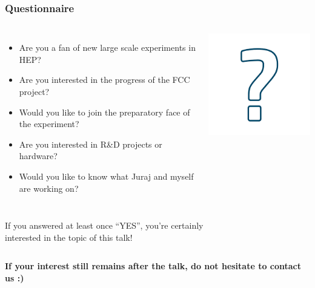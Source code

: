 \documentclass[aspectratio=169]{beamer}
\newcommand{\bluetext}[1]{%
  \textcolor{myBlue}{#1}
}
\begin{document}
\begin{frame}
  \frametitle{Questionnaire}

  \begin{columns}

    \begin{itemize}
      \item Are you a fan of new large scale experiments in HEP\@?
      \item Are you interested in the progress of the FCC project?
      \item Would you like to join the preparatory face of the experiment?
      \item Are you interested in R\&D projects or hardware?
      \item Would you like to know what Juraj and myself are working on?
    \end{itemize}
    \pause%


    \begin{center}
      \includegraphics[width=0.5\linewidth]{figures/question.png}
    \end{center}
  \end{columns}
  \pause%

  \vspace{1ex}
  \bluetext{If you answered at least once ``YES'', you're certainly\\ interested
            in the topic of this talk!}
  \pause%

  \vspace{-3ex}
  \begin{columns}

    \bluetext{\bf If your interest still remains after the talk, do not
              hesitate to contact us :)}



\end{columns}
\end{frame}
\end{document}

